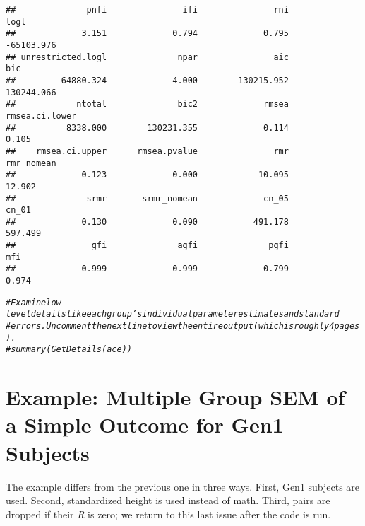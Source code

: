 \documentclass{article}\usepackage[]{graphicx}\usepackage[]{color}
\makeatletter
\newcommand{\hlcom}[1]{\textcolor[rgb]{0.678,0.584,0.686}{\textit{#1}}}%
\newenvironment{kframe}{%
 \def\at@end@of@kframe{}%
 \ifinner\ifhmode%
  \def\at@end@of@kframe{\end{minipage}}%
  \begin{minipage}{\columnwidth}%
 \fi\fi%
 \def\FrameCommand##1{\hskip\@totalleftmargin \hskip-\fboxsep
 \colorbox{shadecolor}{##1}\hskip-\fboxsep
     \hskip-\linewidth \hskip-\@totalleftmargin \hskip\columnwidth}%
 \MakeFramed {\advance\hsize-\width
   \@totalleftmargin\z@ \linewidth\hsize
   \@setminipage}}%
 {\par\unskip\endMakeFramed%
 \at@end@of@kframe}
\newenvironment{knitrout}{}{} %
\makeatother
\begin{document}
\begin{knitrout}
\begin{kframe}
\begin{verbatim}
##              pnfi               ifi               rni              logl 
##             3.151             0.794             0.795        -65103.976 
## unrestricted.logl              npar               aic               bic 
##        -64880.324             4.000        130215.952        130244.066 
##            ntotal              bic2             rmsea    rmsea.ci.lower 
##          8338.000        130231.355             0.114             0.105 
##    rmsea.ci.upper      rmsea.pvalue               rmr        rmr_nomean 
##             0.123             0.000            10.095            12.902 
##              srmr       srmr_nomean             cn_05             cn_01 
##             0.130             0.090           491.178           597.499 
##               gfi              agfi              pgfi               mfi 
##             0.999             0.999             0.799             0.974
\end{verbatim}
\begin{alltt}
\hlcom{#Examine low-level details like each group's individual parameter estimates and standard}
\hlcom{#  errors.  Uncomment the next line to view the entire output (which is roughly 4 pages).}
\hlcom{#summary(GetDetails(ace))}
\end{alltt}
\end{kframe}
\end{knitrout}


\section{Example: Multiple Group SEM of a Simple Outcome for Gen1 Subjects}
The example differs from the previous one in three ways.  First, Gen1 subjects are used.  Second, standardized height is used instead of math.  Third, pairs are dropped if their \emph{R} is zero; we return to this last issue after the code is run.
\end{document}
